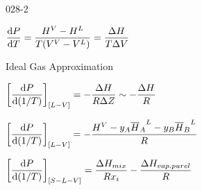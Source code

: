 \begin{mitframe}{028-2}

\begin{listone}

		\item $\dfrac{\mathrm{d}\p}{\mathrm{d}\Temp}=\dfrac{\enthalpy^{\vol}-\enthalpy^{\length}}{\Temp(\vol^{\vol}-\vol^{\length})}=\dfrac{\iipf\enthalpy}{\Temp\iipf\vol}$
	   
		\item Ideal Gas Approximation    	
    
		\item$\bigg[\dfrac{\mathrm{d}\p}{\mathrm{d}(1/\Temp)}\bigg]_{[\length-\vol]}=-\dfrac{\iipf\enthalpy}{\gasconst\iipf\compress}\sim-\dfrac{\iipf\enthalpy}{\gasconst}$  

    	\begin{listtwo}
    		
            \item$\bigg[\dfrac{\mathrm{d}\p}{\mathrm{d}(1/\Temp)}\bigg]_{[\length-\vol]}=-\dfrac{\enthalpy^{\vol}-y_{\helmholtz}{\overline{\enthalpy}_{\helmholtz}}^{\length}-y_{\exergy}{\overline{\enthalpy}_{\exergy}}^{\length}}{\gasconst}$

     	\end{listtwo}

		\item$\bigg[\dfrac{\mathrm{d}\p}{\mathrm{d}(1/\Temp)}\bigg]_{[\entropy-\length-\vol]}=\dfrac{\iipf\enthalpy_{\mixfunc}}{\gasconst\specfrac{i}}-\dfrac{\iipf\enthalpy_{vap. purel}}{\gasconst}$

\end{listone}
    
\end{mitframe}